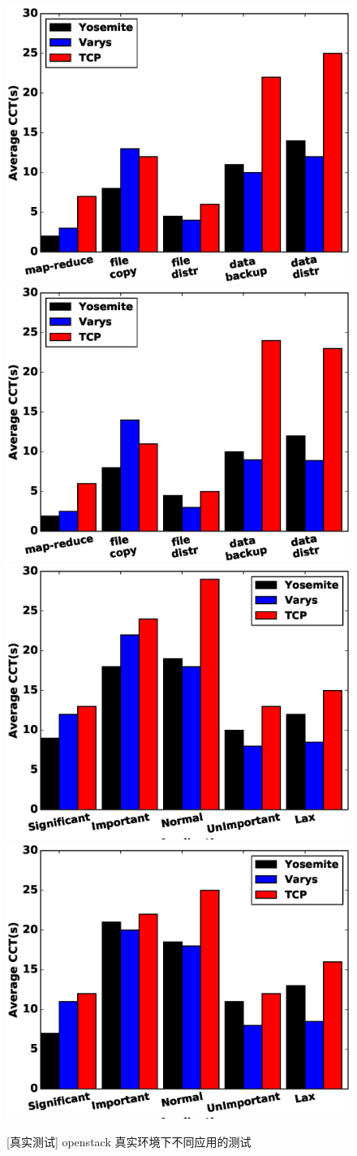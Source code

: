 \begin{figure}[h]
\setlength{\abovecaptionskip}{0pt} 
\setlength{\belowcaptionskip}{1pt} 
  \centering%
    {\includegraphics[width=0.5\columnwidth]{figures/Yosemite/figs/evaluation/ex5/real1.eps}}%
      {\includegraphics[width=0.5\columnwidth]{figures/Yosemite/figs/evaluation/ex5/real2.eps}}
    {\includegraphics[width=0.5\columnwidth]{figures/Yosemite/figs/evaluation/ex5/real3.eps}}%
      {\includegraphics[width=0.5\columnwidth]{figures/Yosemite/figs/evaluation/ex5/real4.eps}}
  \caption{[真实测试] openstack 真实环境下不同应用的测试}
  \label{Yosemite-evaluation_cloud_fig}
\end{figure}
